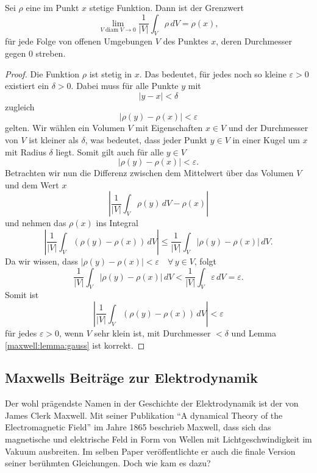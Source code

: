 \begin{lemma}
	\label{maxwell:lemma:gauss}
	Sei $\rho$ eine im Punkt $x$ stetige Funktion. Dann ist der Grenzwert
	\[
	\lim_{V\operatorname{diam}V\to 0} \frac{1}{|V|} \int_V \rho\,dV = \rho(x),
	\]
für jede Folge von offenen Umgebungen $V$ des Punktes $x$, deren Durchmesser gegen 0 streben.
\end{lemma}
\begin{proof}
	Die Funktion $\rho$ ist stetig in $x$. Das bedeutet, für jedes noch so kleine $\varepsilon > 0$ existiert ein $\delta > 0$.
	Dabei muss für alle Punkte $y$ mit
	\[
	\left|y-x\right| < \delta	
	\]
	zugleich 
	\[
	\left|\rho(y) - \rho(x)\right| < \varepsilon
	\] 
	gelten.
	Wir wählen ein Volumen $V$ mit Eigenschaften $x \in V$ und der Durchmesser von $V$ ist kleiner als $\delta$, was bedeutet, dass jeder Punkt $y \in V$ in einer Kugel um $x$ mit Radius $\delta$ liegt.
	Somit gilt auch für alle $y \in V$
	\[
	\left|\rho(y) - \rho(x)\right| < \varepsilon .
	\]
	Betrachten wir nun die Differenz zwischen dem Mittelwert über das Volumen $V$ und dem Wert $x$
	\[
	\left|
	\frac{1}{\left|V\right|}
	\int_{V}
	\rho(y)
	\,
	dV
	-
	\rho(x)
	\right|
	\]
	und nehmen das $\rho(x)$ ins Integral
	\[
	\left|
	\frac{1}{\left|V\right|}
	\int_{V}
	(\rho(y) - \rho(x)) \, dV
	\right|
	\leq
	\frac{1}{\left|V\right|}
	\int_{V}
	\left|
	\rho(y) - \rho(x)
	\right|
	\,
	dV .
	\]
	Da wir wissen, dass $\left|\rho(y) - \rho(x)\right| < \varepsilon \quad \forall \, y \in V$, folgt
	\[
	\frac{1}{\left|V\right|}
	\int_{V}
	\left|
	\rho(y) - \rho(x)
	\right|
	\,
	dV
	<
	\frac{1}{\left|V\right|}
	\int_{V}
	\varepsilon
	\,
	dV
	=
	\varepsilon .
	\]
	Somit ist 
	\[
	\left|
	\frac{1}{\left|V\right|}
	\int_{V}
	(\rho(y) - \rho(x)) \, dV
	\right|
	<
	\varepsilon
	\]
	für jedes $\varepsilon > 0$, wenn $V$ sehr klein ist, mit Durchmesser $< \delta$ und Lemma \ref{maxwell:lemma:gauss} ist korrekt.
\end{proof}


\subsection{Maxwells Beiträge zur Elektrodynamik}
Der wohl prägendste Namen in der Geschichte der Elektrodynamik ist der von James Clerk Maxwell.
%
Mit seiner Publikation ``A dynamical Theory of the Electromagnetic Field'' \cite{maxwell:maxwell:theory} im Jahre 1865 beschrieb Maxwell, dass sich das magnetische und elektrische Feld in Form von Wellen mit Lichtgeschwindigkeit im Vakuum ausbreiten.
%
%
Im selben Paper veröffentlichte er auch die finale Version seiner berühmten Gleichungen. Doch wie kam es dazu?

